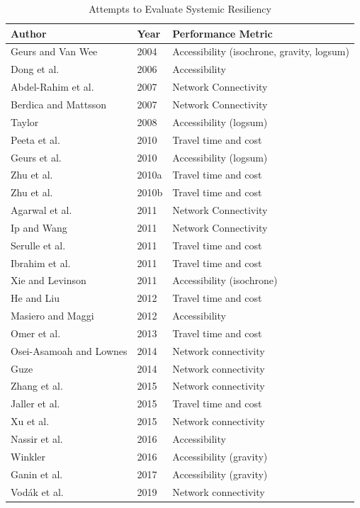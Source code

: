 \begin{table}[h]

\caption{\label{tab:authortable}Attempts to Evaluate Systemic Resiliency}
\centering
\begin{tabular}[t]{lll}
\toprule
Author & Year & Performance Metric\\
\midrule
Geurs and Van Wee & 2004 & Accessibility (isochrone, gravity, logsum)\\
Dong et al. & 2006 & Accessibility\\
Abdel-Rahim et al. & 2007 & Network Connectivity\\
Berdica and Mattsson & 2007 & Network Connectivity\\
Taylor & 2008 & Accessibility (logsum)\\
Peeta et al. & 2010 & Travel time and cost\\
Geurs et al. & 2010 & Accessibility (logsum)\\
Zhu et al. & 2010a & Travel time and cost\\
Zhu et al. & 2010b & Travel time and cost\\
Agarwal et al. & 2011 & Network Connectivity\\
Ip and Wang & 2011 & Network Connectivity\\
Serulle et al. & 2011 & Travel time and cost\\
Ibrahim et al. & 2011 & Travel time and cost\\
Xie and Levinson & 2011 & Accessibility (isochrone)\\
He and Liu & 2012 & Travel time and cost\\
Masiero and Maggi & 2012 & Accessibility \\
Omer et al. & 2013 & Travel time and cost\\
Osei-Asamoah and Lownes & 2014 & Network connectivity\\
Guze & 2014 & Network connectivity\\
Zhang et al. & 2015 & Network connectivity\\
Jaller et al. & 2015 & Travel time and cost\\
Xu et al. & 2015 & Network connectivity\\
Nassir et al. & 2016 & Accessibility \\
Winkler & 2016 & Accessibility (gravity)\\
Ganin et al. & 2017 & Accessibility (gravity)\\
Vodák et al. & 2019 & Network connectivity\\
\bottomrule
\end{tabular}
\end{table}

